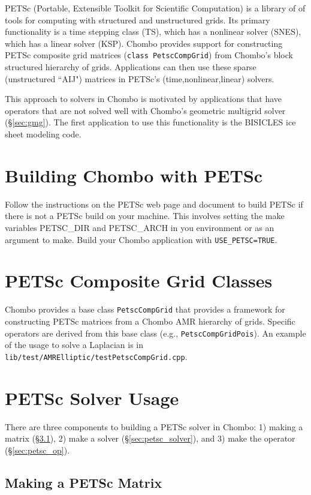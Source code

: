 PETSc (Portable, Extensible Toolkit for Scientific Computation) is a library of of tools for computing with structured and unstructured grids.
Its primary functionality is a time stepping class (TS), which has a nonlinear solver (SNES), which has a linear solver (KSP).
Chombo provides support for constructing PETSc composite grid matrices (\texttt{class PetscCompGrid}) from Chombo's block structured hierarchy of grids.
Applications can then use these sparse (unstructured ``AIJ") matrices in PETSc's (time,nonlinear,linear) solvers.

This approach to solvers in Chombo is motivated by applications that have operators that are not solved well with Chombo's geometric multigrid solver (\S\ref{sec:gmg}).
The first application to use this functionality is the BISICLES ice sheet modeling code.

\section{Building Chombo with PETSc}

Follow the instructions on the PETSc web page and document to build PETSc if there is not a PETSc build on your machine.
This involves setting the make variables PETSC\_DIR and PETSC\_ARCH in you environment or as an argument to make.
Build your Chombo application with \texttt{USE\_PETSC=TRUE}.

\section{PETSc Composite Grid Classes}

Chombo provides a base class \texttt{PetscCompGrid} that provides a framework for constructing PETSc matrices from a Chombo AMR hierarchy of grids.
Specific operators are derived from this base class (e.g., \texttt{PetscCompGridPois}).
An example of the usage to solve a Laplacian is in \texttt{lib/test/AMRElliptic/testPetscCompGrid.cpp}.

\section{PETSc Solver Usage}

There are three components to building a PETSc solver in Chombo: 1) making a matrix (\S\ref{sec:petsc_mat}), 2) make a solver (\S\ref{sec:petsc_solver}), and 3) make the operator (\S\ref{sec:petsc_op}).

\subsection{Making a PETSc Matrix}
\label{sec:petsc_mat}

